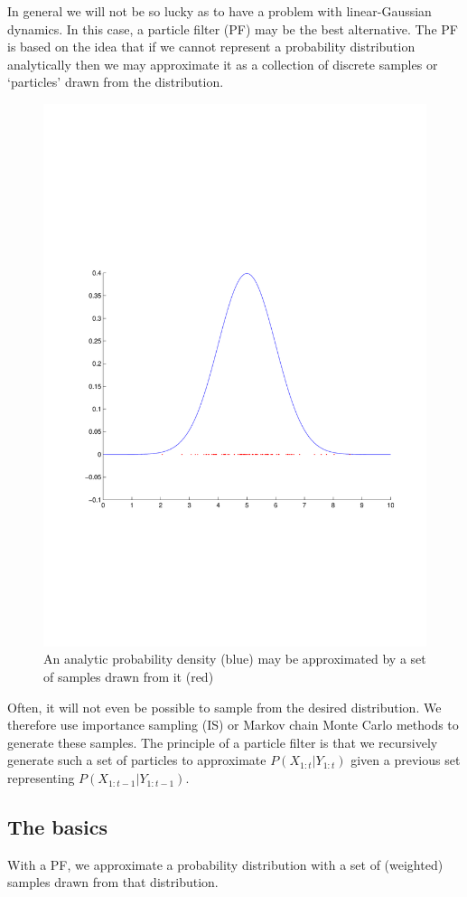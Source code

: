 In general we will not be so lucky as to have a problem with linear-Gaussian dynamics. In this case, a particle filter (PF) may be the best alternative. The PF is based on the idea that if we cannot represent a probability distribution analytically then we may approximate it as a collection of discrete samples or `particles' drawn from the distribution.

\begin{figure} \centering
\includegraphics[width=0.7\columnwidth]{MonteCarlo.pdf}%
\caption{An analytic probability density (blue) may be approximated by a set of samples drawn from it (red)}%
\label{fig:MonteCarlo}%
\end{figure}

Often, it will not even be possible to sample from the desired distribution. We therefore use importance sampling (IS) or Markov chain Monte Carlo methods to generate these samples. The principle of a particle filter is that we recursively generate such a set of particles to approximate $P(X_{1:t}|Y_{1:t})$ given a previous set representing $P(X_{1:t-1}|Y_{1:t-1})$.

\subsection{The basics}

With a PF, we approximate a probability distribution with a set of (weighted) samples drawn from that distribution.

